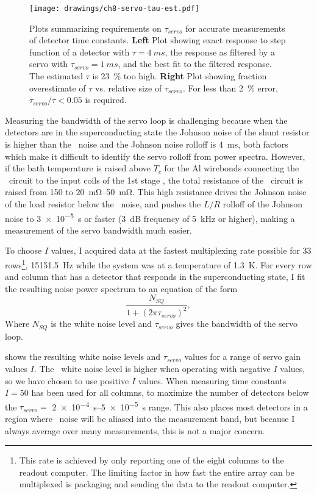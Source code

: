 \begin{figure*}
\texttt{[image: drawings/ch8-servo-tau-est.pdf]}
\caption{Plots summarizing requirements on $\tau_{servo}$ for accurate measurements of detector time constants.
\textbf{Left} Plot showing exact response to step function of a detector with $\tau = \SI{4}{ms}$, the response as filtered by a servo with $\tau_{servo} = \SI{1}{ms}$, and the best fit to the filtered response. The estimated $\tau$ is \SI{23}{\percent} too high.
\textbf{Right} Plot showing fraction overestimate of $\tau$ vs. relative size of $\tau_{servo}$.
For less than \SI{2}{\percent} error, $\tau_{servo}/\tau < \num{0.05}$ is required.
}
\label{fig:ch8-servo-tau-est}
\end{figure*}

Measuring the bandwidth of the servo loop is challenging because when the detectors are in the superconducting state the Johnson noise of the shunt resistor is higher than the \SQUID\ noise and the Johnson noise rolloff is \abt \SI{4}{\ms}, both factors which make it difficult to identify the servo rolloff from power spectra.
However, if the bath temperature is raised above $T_c$ for the Al wirebonds connecting the \TES\ circuit to the input coils of the 1st stage \SQUIDs, the total resistance of the \TES\ circuit is raised from \SI{150}{\uohm} to \SIrange{20}{50}{\mohm}.
This high resistance drives the Johnson noise of the load resistor below the \SQUID\ noise, and pushes the $L/R$ rolloff of the Johnson noise to \SI{3e-5}{s} or faster (\SI{3}{\dB} frequency of \SI{5}{\kilo\Hz} or higher), making a measurement of the servo bandwidth much easier.

To choose $I$ values, I acquired data at the fastest multiplexing rate possible for 33 rows\footnote{This rate is achieved by only reporting one of the eight columns to the readout computer. The limiting factor in how fast the entire array can be multiplexed is packaging and sending the data to the readout computer.}, \SI{15151.5}{Hz} while the system was at a temperature of \SI{1.3}{\K}.
For every row and column that has a detector that responds in the superconducting state, I fit the resulting noise power spectrum to an equation of the form
\begin{equation}
  \frac{N_{SQ}}{1 + (2 \pi \tau_{servo})^2},
\end{equation}
Where $N_{SQ}$ is the white noise level and $\tau_{servo}$ gives the bandwidth of the servo loop.

 shows the resulting white noise levels and $\tau_{servo}$ values for a range of servo gain values $I$.
The \SQUID\ white noise level is higher when operating with negative $I$ values, so we have chosen to use positive $I$ values.
When measuring time constants $I=50$ has been used for all columns, to maximize the number of detectors below the $\tau_{servo} =$ \SIrange{2e-4}{5e-5}{s} range.
This also places most detectors in a region where \SQUID\ noise will be aliased into the measurement band, but because I always average over many measurements, this is not a major concern.

